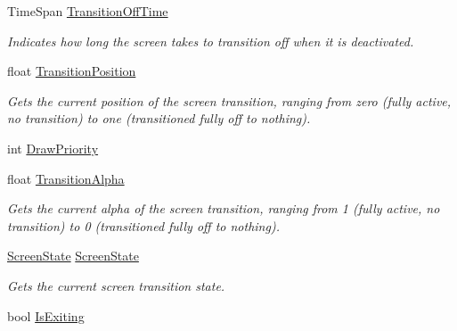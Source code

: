 \begin{DoxyCompactItemize}
Time\+Span \hyperlink{classgearit_1_1xna_1_1_game_screen_af44db4f893dc3ddfb5bc1db19cef96d2}{Transition\+Off\+Time}
\begin{DoxyCompactList}\small\item\em Indicates how long the screen takes to transition off when it is deactivated. \end{DoxyCompactList}\item 
float \hyperlink{classgearit_1_1xna_1_1_game_screen_a768dba0b54380da831c21705866043a4}{Transition\+Position}
\begin{DoxyCompactList}\small\item\em Gets the current position of the screen transition, ranging from zero (fully active, no transition) to one (transitioned fully off to nothing). \end{DoxyCompactList}\item 
int \hyperlink{classgearit_1_1xna_1_1_game_screen_ab052309db69c10959303c43c59381aa6}{Draw\+Priority}
\item 
float \hyperlink{classgearit_1_1xna_1_1_game_screen_a5fe8bffc9a9e5d36e77e3ebadd9e8685}{Transition\+Alpha}
\begin{DoxyCompactList}\small\item\em Gets the current alpha of the screen transition, ranging from 1 (fully active, no transition) to 0 (transitioned fully off to nothing). \end{DoxyCompactList}\item 
\hyperlink{namespacegearit_1_1xna_a31b84963a73312899ecc8b0684c41d9e}{Screen\+State} \hyperlink{classgearit_1_1xna_1_1_game_screen_a2bdf13bb100f4e09a7797d85570b80e7}{Screen\+State}
\begin{DoxyCompactList}\small\item\em Gets the current screen transition state. \end{DoxyCompactList}\item 
bool \hyperlink{classgearit_1_1xna_1_1_game_screen_a30f6d7ee7a46daca6d597f55573663ee}{Is\+Exiting}

\end{DoxyCompactItemize}
